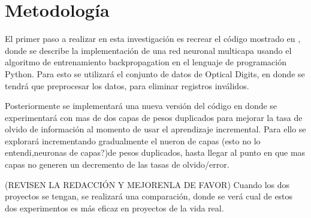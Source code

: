 \section{Metodología}
    El primer paso a realizar en esta investigación es recrear el código mostrado en \cite{bullinaria2009}, donde se describe la implementación de una red  neuronal multicapa usando el algoritmo de entrenamiento backpropagation en el lenguaje de programación Python.  Para esto se utilizará el conjunto de datos de Optical Digits,  en donde se tendrá que preprocesar los datos, para eliminar registros inválidos. 

    Posteriormente se implementará una nueva versión del código en donde se experimentará con mas de dos capas de pesos duplicados para mejorar la tasa de olvido de información al momento de usar el aprendizaje incremental.  Para ello se explorará incrementando gradualmente el nueron de capas (esto no lo entendi,neuronas de capas?)de pesos duplicados, hasta llegar al punto en que mas capas no generen un decremento de las tasas de olvido/error.

(REVISEN LA REDACCIÓN Y MEJORENLA DE FAVOR)
    Cuando los dos proyectos se tengan, se realizar\'a una comparación, donde se ver\'a cual de estos dos experimentos
    es más eficaz en proyectos de la vida real.
    


